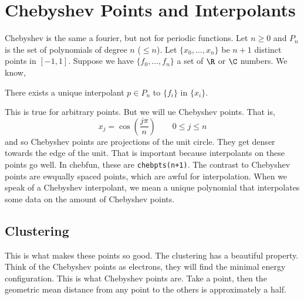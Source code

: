 \section{Chebyshev Points and Interpolants}
Chebyshev is the same a fourier, but not for periodic functions. Let $n \ge 0$ and $P_n$ is the set of polynomials of degree $n$ ($\le n$). Let $\{x_0, \dots, x_n\}$ be $n + 1$ distinct points in $[-1, 1]$. Suppose we have $\{f_0, \dots, f_n\}$ a set of $\R $ or $ \C$ numbers. We know,
\begin{claim}
  There exists a unique interpolant $p \in P_n$ to $\{f_i\}$ in $\{x_i\}$.
\end{claim}

\noindent
This is true for arbitrary points. But we will ue Chebyshev points. That is,
$$ x_j = \cos \left( \frac{j\pi }{n} \right) \qquad 0 \le j \le n $$
and so Chebyshev points are projections of the unit circle. They get denser towards the edge of the unit. That is important because interpolants on these points go well. In chebfun, these are \texttt{chebpts(n+1)}. The contrast to Chebyshev points are ewqually spaced points, which are awful for interpolation. When we speak of a Chebyshev interpolant, we mean a unique polynomial that interpolates some data on the amount of Chebyshev points.

\subsection{Clustering}
This is what makes these points so good. The clustering has a beautiful property. Think of the Chebyshev points as electrons, they will find the minimal energy configuration. This is what Chebyshev points are. Take a point, then the geometric mean distance from any point to the others is approximately a half.